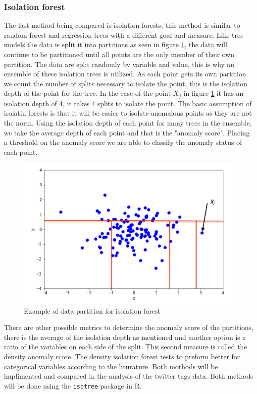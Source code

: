 \documentclass{article}
\begin{document}
\subsubsection{Isolation forest}
The last method being compared is isolation forests, this method is similar to random forest and regression trees with a different goal and measure. Like tree models the data is split it into partitions as seen in figure \ref{fig:iso_fig}, the data will continue to be partitioned until all points are the only member of their own partition. The data are split randomly by variable and value, this is why an ensemble of these isolation trees is utilized. As each point gets its own partition we count the number of splits necessary to isolate the point, this is the isolation depth of the point for the tree. In the case of the point $X_j$ in figure \ref{fig:iso_fig} it has an isolation depth of 4, it takes 4 splits to isolate the point. The basic assumption of isolatin forests is that it will be easier to isolate anomalous points as they are not the norm. Using the isolation depth of each point for many trees in the ensemble, we take the average depth of each point and that is the "anomaly score". Placing a threshold on the anomaly score we are able to classify the anomaly status of each point.

\begin{figure}[!ht]
    \centering
    \includegraphics[width=.6\textwidth]{../Isolating_an_Anomalous_Point.png}
    \caption{Example of data partition for isolation forest}
    \label{fig:iso_fig}
\end{figure}

There are other possible metrics to determine the anomaly score of the partitions, there is the average of the isolation depth as mentioned and another option is a ratio of the variables on each side of the split. This second measure is called the density anomaly score. The density isolation forest tests to preform better for categorical variables according to the liturature. Both mothods will be implimented and compared in the analysis of the twitter tags data. Both methods will be done using the \texttt{isotree} package in R.
\end{document}
